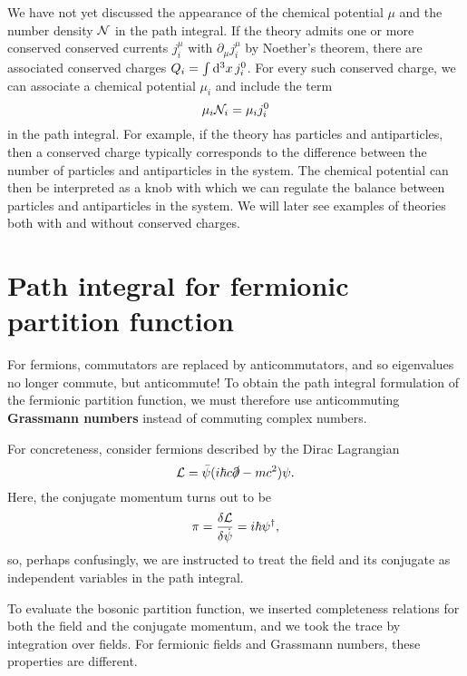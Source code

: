We have not yet discussed the appearance of the chemical potential $\mu$ and the number density $\mathcal{N}$ in the path integral.
If the theory admits one or more conserved conserved currents $j_i^\mu$ with $\partial_\mu j_i^\mu$ by Noether's theorem, there are associated conserved charges $Q_i = \int \mathop{}\!\mathrm{d}^3 x \, j_i^0$.
For every such conserved charge, we can associate a chemical potential $\mu_i$ and include the term
\begin{equation}
	\mu_i \mathcal{N}_i = \mu_i j_i^0
\label{eq:tft:chemical_potential}
\end{equation}
in the path integral.
For example, if the theory has particles and antiparticles, then a conserved charge typically corresponds to the difference between the number of particles and antiparticles in the system.
The chemical potential can then be interpreted as a knob with which we can regulate the balance between particles and antiparticles in the system.
We will later see examples of theories both with and without conserved charges.


\section{Path integral for fermionic partition function}


For fermions, commutators are replaced by anticommutators, and so eigenvalues no longer commute, but anticommute!
To obtain the path integral formulation of the fermionic partition function, we must therefore use anticommuting \textbf{Grassmann numbers} instead of commuting complex numbers.

For concreteness, consider fermions described by the Dirac Lagrangian
\begin{equation}
	\mathcal{L} = \bar{\psi} (i \hbar c \slashed\partial - m c^2) \psi .
\end{equation}
Here, the conjugate momentum turns out to be
\begin{equation}
	\pi = \fdv{\lagr}{\dot\psi} = i \hbar \psi^\dagger ,
\label{eq:tft:dirac_conjugate_momentum}
\end{equation}
so, perhaps confusingly, we are instructed to treat the field and its conjugate as independent variables in the path integral.

To evaluate the bosonic partition function, we inserted completeness relations for both the field and the conjugate momentum, and we took the trace by integration over fields.
For fermionic fields and Grassmann numbers, these properties are different.

